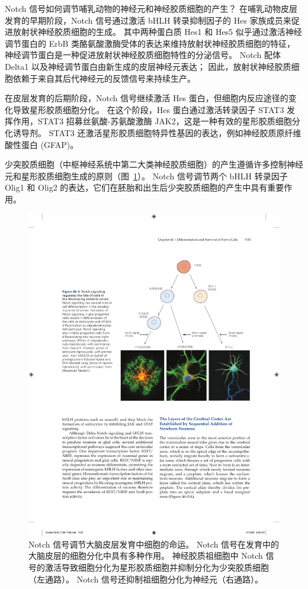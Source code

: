 Notch 信号如何调节哺乳动物的神经元和神经胶质细胞的产生？
在哺乳动物皮层发育的早期阶段，Notch 信号通过激活 bHLH 转录抑制因子的 Hes 家族成员来促进放射状神经胶质细胞的生成。
其中两种蛋白质 Hes1 和 Hes5 似乎通过激活神经调节蛋白的 ErbB 类酪氨酸激酶受体的表达来维持放射状神经胶质细胞的特征，神经调节蛋白是一种促进放射状神经胶质细胞特性的分泌信号。
Notch 配体 Delta1 以及神经调节蛋白由新生成的皮层神经元表达；
因此，放射状神经胶质细胞依赖于来自其后代神经元的反馈信号来持续生产。


在皮层发育的后期阶段，Notch 信号继续激活 Hes 蛋白，但细胞内反应途径的变化导致星形胶质细胞分化。
在这个阶段，Hes 蛋白通过激活转录因子 STAT3 发挥作用，STAT3 招募丝氨酸-苏氨酸激酶 JAK2，这是一种有效的星形胶质细胞分化诱导剂。
STAT3 还激活星形胶质细胞特异性基因的表达，例如神经胶质原纤维酸性蛋白 (GFAP)。


少突胶质细胞（中枢神经系统中第二大类神经胶质细胞）的产生遵循许多控制神经元和星形胶质细胞生成的原则（图~\ref{fig:46_4}）。
Notch 信号调节两个 bHLH 转录因子 Olig1 和 Olig2 的表达，它们在胚胎和出生后少突胶质细胞的产生中具有重要作用。


\begin{figure}[htbp]
	\centering
	\includegraphics[width=0.7\linewidth]{chap46/fig_46_4}
	\caption{Notch 信号调节大脑皮层发育中细胞的命运。
		Notch 信号在发育中的大脑皮层的细胞分化中具有多种作用。
		神经胶质祖细胞中 Notch 信号的激活导致细胞分化为星形胶质细胞并抑制分化为少突胶质细胞（左通路）。
		Notch 信号还抑制祖细胞分化为神经元（右通路）。}
	\label{fig:46_4}
\end{figure}


